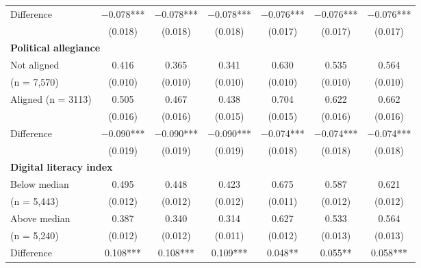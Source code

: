 \documentclass[letterpaper, 12pt, parskip=full,DIV=10]{scrartcl}
\begin{document}
\begin{table}[H]
{\begin{tabular}{lcccccc}
\cmidrule(lr){2-7}
\hspace{1em} Difference  & \num{-0.078}*** & \num{-0.078}*** & \num{-0.078}*** & \num{-0.076}*** & \num{-0.076}*** & \num{-0.076}***\\
 & (\num{0.018}) & (\num{0.018}) & (\num{0.018}) & (\num{0.017}) & (\num{0.017}) & (\num{0.017})\\
 \multicolumn{4}{l}{\textbf{Political allegiance}} \rule{0pt}{1.2\normalbaselineskip}\\
\hspace{1em} Not aligned & \num{0.416} & \num{0.365} & \num{0.341} & \num{0.630} & \num{0.535} & \num{0.564}\\
\hspace{1.5em} (n = 7,570)  & (\num{0.010}) & (\num{0.010}) & (\num{0.010}) & (\num{0.010}) & (\num{0.010}) & (\num{0.010})\\\hspace{1em} Aligned  (n = 3113) & \num{0.505} & \num{0.467} & \num{0.438} & \num{0.704} & \num{0.622} & \num{0.662}\\
 & (\num{0.016}) & (\num{0.016}) & (\num{0.015}) & (\num{0.015}) & (\num{0.016}) & (\num{0.016})\\
 \cmidrule(lr){2-7}
\hspace{1em} Difference & \num{-0.090}*** & \num{-0.090}*** & \num{-0.090}*** & \num{-0.074}*** & \num{-0.074}*** & \num{-0.074}***\\
 & (\num{0.019}) & (\num{0.019}) & (\num{0.019}) & (\num{0.018}) & (\num{0.018}) & (\num{0.018})\\
\multicolumn{4}{l}{\textbf{Digital literacy index }}  \rule{0pt}{1.2\normalbaselineskip}\\
\hspace{1em} Below median & \num{0.495} & \num{0.448} & \num{0.423} & \num{0.675} & \num{0.587} & \num{0.621}\\
 \hspace{1.5em}  (n = 5,443) & (\num{0.012}) & (\num{0.012}) & (\num{0.012}) & (\num{0.011}) & (\num{0.012}) & (\num{0.012})\\\hspace{1em} Above median  & \num{0.387} & \num{0.340} & \num{0.314} & \num{0.627} & \num{0.533} & \num{0.564}\\
 \hspace{1.5em}  (n = 5,240) & (\num{0.012}) & (\num{0.012}) & (\num{0.011}) & (\num{0.012}) & (\num{0.013}) & (\num{0.013})\\
\cmidrule(lr){2-7}
\hspace{1em} Difference & \num{0.108}*** & \num{0.108}*** & \num{0.109}*** & \num{0.048}** & \num{0.055}** & \num{0.058}***\\

\end{tabular}}
\end{table}
\end{document}
